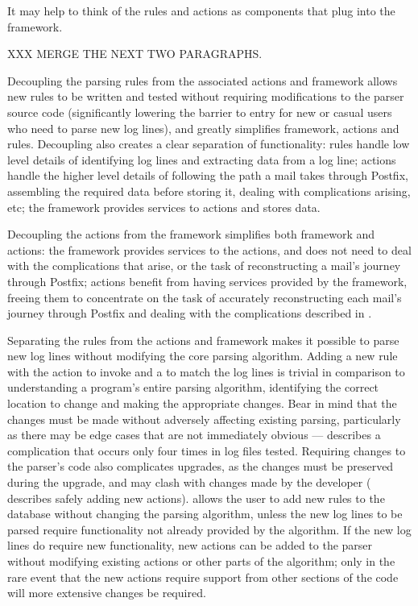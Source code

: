 It may help to think of the rules and actions as components that plug into
the framework.  

\label{why separate rules, actions and framework?}

XXX MERGE THE NEXT TWO PARAGRAPHS\@.

Decoupling the parsing rules from the associated actions and framework
allows new rules to be written and tested without requiring modifications
to the parser source code (significantly lowering the barrier to entry for
new or casual users who need to parse new log lines), and greatly
simplifies framework, actions and rules.  Decoupling also creates a clear
separation of functionality: rules handle low level details of identifying
log lines and extracting data from a log line; actions handle the higher
level details of following the path a mail takes through Postfix,
assembling the required data before storing it, dealing with complications
arising, etc; the framework provides services to actions and stores data.

Decoupling the actions from the framework simplifies both framework and
actions: the framework provides services to the actions, and does not need
to deal with the complications that arise, or the task of reconstructing a
mail's journey through Postfix; actions benefit from having services
provided by the framework, freeing them to concentrate on the task of
accurately reconstructing each mail's journey through Postfix and dealing
with the complications described in .

Separating the rules from the actions and framework makes it possible to
parse new log lines without modifying the core parsing algorithm.  Adding a
new rule with the action to invoke and a \regex{} to match the log lines is
trivial in comparison to understanding a program's entire parsing
algorithm, identifying the correct location to change and making the
appropriate changes.  Bear in mind that the changes must be made without
adversely affecting existing parsing, particularly as there may be edge
cases that are not immediately obvious ---
 describes a complication
that occurs only four times in \numberOFlogFILES{} log files tested.
Requiring changes to the parser's code also complicates upgrades, as the
changes must be preserved during the upgrade, and may clash with changes
made by the developer ( describes safely
adding new actions).  \parsername{} allows the user to add new rules to the
database without changing the parsing algorithm, unless the new log lines
to be parsed require functionality not already provided by the algorithm.
If the new log lines do require new functionality, new actions can be added
to the parser without modifying existing actions or other parts of the
algorithm; only in the rare event that the new actions require support from
other sections of the code will more extensive changes be required.

